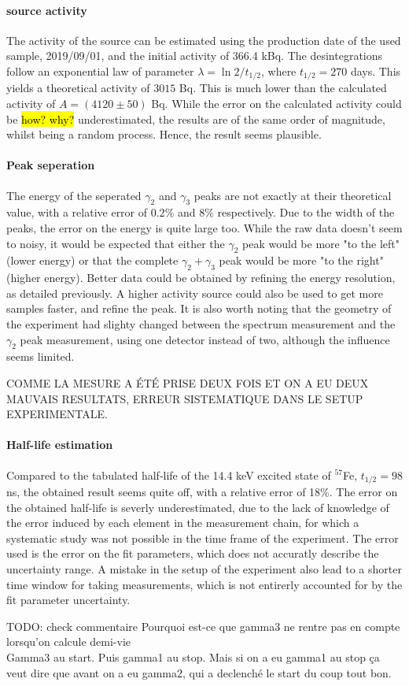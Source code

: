 \paragraph{\cobalt source activity}
The activity of the source can be estimated using the production date of the used sample, 2019/09/01, and the initial activity of 366.4 kBq. The desintegrations follow an exponential law of parameter \(\lambda = \ln 2 / t_{1/2}\), where \(t_{1/2} = 270\) days. This yields a theoretical activity of \(3015\) Bq. This is much lower than the calculated activity of \(A = (4120 \pm 50)\) Bq. While the error on the calculated activity could be \hl{how? why?} underestimated, the results are of the same order of magnitude, whilst being a random process. Hence, the result seems plausible.

\paragraph{Peak seperation}
The energy of the seperated \(\gamma_2\) and \(\gamma_3\) peaks are not exactly at their theoretical value, with a relative error of \(0.2\%\) and \(8\%\) respectively. Due to the width of the peaks, the error on the energy is quite large too. While the raw data doesn't seem to noisy, it would be expected that either the \(\gamma_2\) peak would be more "to the left" (lower energy) or that the complete \(\gamma_2+\gamma_3\) peak would be more "to the right" (higher energy). Better data could be obtained by refining the energy resolution, as detailed previously. A higher activity source could also be used to get more samples faster, and refine the peak. It is also worth noting that the geometry of the experiment had slighty changed between the spectrum measurement and the \(\gamma_2\) peak measurement, using one detector instead of two, although the influence seems limited.

COMME LA MESURE A ÉTÉ PRISE DEUX FOIS ET ON A EU DEUX MAUVAIS RESULTATS, ERREUR SISTEMATIQUE DANS LE SETUP EXPERIMENTALE.

\paragraph{Half-life estimation}
Compared to the tabulated half-life of the 14.4 keV excited state of $^{57}$Fe, \(t_{1/2} = 98\) ns, the obtained result seems quite off, with a relative error of 18\%. The error on the obtained half-life is severly underestimated, due to the lack of knowledge of the error induced by each element in the measurement chain, for which a systematic study was not possible in the time frame of the experiment. The error used is the error on the fit parameters, which does not accuratly describe the uncertainty range. A mistake in the setup of the experiment also lead to a shorter time window for taking measurements, which is not entirerly accounted for by the fit parameter uncertainty.

TODO: check commentaire
Pourquoi est-ce que gamma3 ne rentre pas en compte lorsqu'on calcule demi-vie \\
Gamma3 au start. Puis gamma1 au stop. Mais si on a eu gamma1 au stop ça veut dire que avant on a eu gamma2, qui a declenché le start du coup tout bon.
